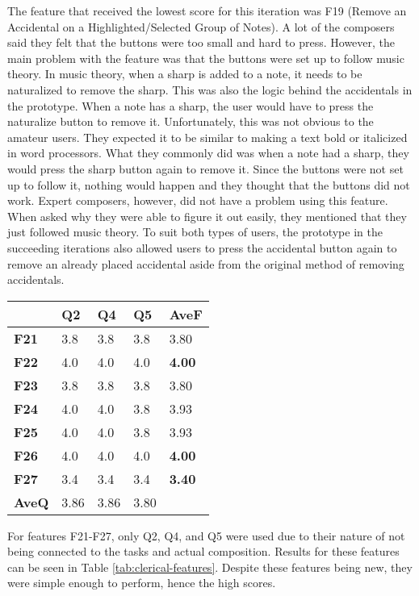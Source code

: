 			The feature that received the lowest score for this iteration was F19 (Remove an Accidental on a Highlighted/Selected Group of Notes). A lot of the composers said they felt that the buttons were too small and hard to press. However, the main problem with the feature was that the buttons were set up to follow music theory. In music theory, when a sharp is added to a note, it needs to be naturalized to remove the sharp. This was also the logic behind the accidentals in the prototype. When a note has a sharp, the user would have to press the naturalize button to remove it. Unfortunately, this was not obvious to the amateur users. They expected it to be similar to making a text bold or italicized in word processors. What they commonly did was when a note had a sharp, they would press the sharp button again to remove it. Since the buttons were not set up to follow it, nothing would happen and they thought that the buttons did not work. Expert composers, however, did not have a problem using this feature. When asked why they were able to figure it out easily, they mentioned that they just followed music theory. To suit both types of users, the prototype in the succeeding iterations also allowed users to press the accidental button again to remove an already placed accidental aside from the original method of removing accidentals.

			\begin{table}[!htpb]
			  \centering
			   \label{tab:cleric-features}
			  \begin{tabular}{|R{1.5cm}|R{1cm}|R{1cm}|R{1cm}|R{1.5cm}|} \hline
			  	& \textbf{Q2} & \textbf{Q4} & \textbf{Q5} & \textbf{AveF} \\ \hline
			  	\textbf{F21} & 3.8 	& 3.8 	& 3.8 	& 3.80 \\ \hline
			    \textbf{F22} & 4.0 	& 4.0 	& 4.0 	& \textbf{4.00} \\ \hline
			    \textbf{F23} & 3.8 	& 3.8 	& 3.8 	& 3.80 \\ \hline
			    \textbf{F24} & 4.0 	& 4.0 	& 3.8 	& 3.93 \\ \hline
			    \textbf{F25} & 4.0 	& 4.0 	& 3.8 	& 3.93 \\ \hline
			    \textbf{F26} & 4.0 	& 4.0 	& 4.0 	& \textbf{4.00} \\  \hline
			    \textbf{F27} & 3.4 	& 3.4 	& 3.4 	& \textbf{3.40} \\ \hline
			    \textbf{AveQ} & 3.86 & 3.86 & 3.80 & \\ \hline
			  \end{tabular}
			\end{table}

			For features F21-F27, only Q2, Q4, and Q5 were used due to their nature of not being connected to the tasks and actual composition. Results for these features can be seen in Table \ref{tab:clerical-features}. Despite these features being new, they were simple enough to perform, hence the high scores.